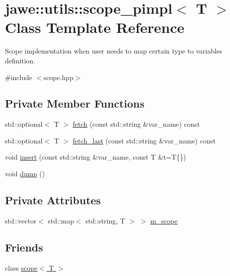 \hypertarget{classjawe_1_1utils_1_1scope__pimpl}{}\section{jawe\+:\+:utils\+:\+:scope\+\_\+pimpl$<$ T $>$ Class Template Reference}
\label{classjawe_1_1utils_1_1scope__pimpl}


Scope implementation when user needs to map certain type to variable\textquotesingle{}s definition.  




{\ttfamily \#include $<$scope.\+hpp$>$}

\subsection*{Private Member Functions}
\begin{DoxyCompactItemize}
\item 
std\+::optional$<$ T $>$ \hyperlink{classjawe_1_1utils_1_1scope__pimpl_ae35dce5405fb77cc36b0060fed59086c}{fetch} (const std\+::string \&var\+\_\+name) const
\item 
std\+::optional$<$ T $>$ \hyperlink{classjawe_1_1utils_1_1scope__pimpl_a839753794d639687f56213cd07eb732c}{fetch\+\_\+last} (const std\+::string \&var\+\_\+name) const
\item 
void \hyperlink{classjawe_1_1utils_1_1scope__pimpl_a6c941f1e400500a32d15a577eeabeda1}{insert} (const std\+::string \&var\+\_\+name, const T \&t=T\{\})
\item 
void \hyperlink{classjawe_1_1utils_1_1scope__pimpl_a0122f51a341a4bb251bbc8b0178c3a7e}{dump} ()
\end{DoxyCompactItemize}
\subsection*{Private Attributes}
\begin{DoxyCompactItemize}
\item 
std\+::vector$<$ std\+::map$<$ std\+::string, T $>$ $>$ \hyperlink{classjawe_1_1utils_1_1scope__pimpl_aec4e4f947e22b0ff1da66856b4dbd88e}{m\+\_\+scope}
\end{DoxyCompactItemize}
\subsection*{Friends}
\begin{DoxyCompactItemize}
\item 
class \hyperlink{classjawe_1_1utils_1_1scope__pimpl_a158486513ead5908db686c9f04b48af8}{scope$<$ T $>$}
\end{DoxyCompactItemize}


